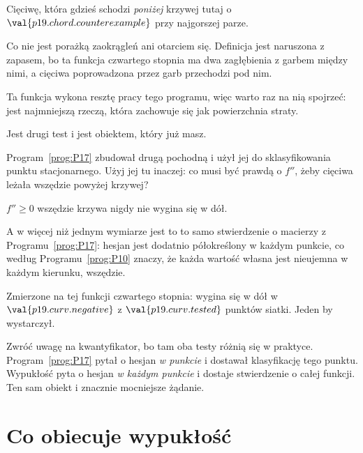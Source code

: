 \begin{fr}
\begin{ansblock}
Cięciwę, która gdzieś schodzi \emph{poniżej} krzywej \dash{} tutaj o
$\val{p19.chord.counterexample}$ przy najgorszej parze.
\end{ansblock}

Co nie jest porażką zaokrągleń ani otarciem się. Definicja jest naruszona z
zapasem, bo ta funkcja czwartego stopnia ma dwa zagłębienia z garbem między
nimi, a cięciwa poprowadzona przez garb przechodzi pod nim.

Ta funkcja wykona resztę pracy tego programu, więc warto raz na nią spojrzeć:
jest najmniejszą rzeczą, która zachowuje się jak powierzchnia straty.
\end{fr}

\begin{fr}
Jest drugi test i jest obiektem, który już masz.

Program~\ref{prog:P17} zbudował drugą pochodną i użył jej do sklasyfikowania
punktu stacjonarnego. Użyj jej tu inaczej: co musi być prawdą o $f''$, żeby
cięciwa leżała wszędzie powyżej krzywej?
\dotline
\nextframe
\end{fr}

\begin{fr}
\begin{ansblock}
$f'' \ge 0$ wszędzie \dash{} krzywa nigdy nie wygina się w dół.
\end{ansblock}

A w więcej niż jednym wymiarze jest to to samo stwierdzenie o macierzy z
Programu~\ref{prog:P17}: hesjan jest dodatnio półokreślony w każdym punkcie,
co według Programu~\ref{prog:P10} znaczy, że każda wartość własna jest
nieujemna w każdym kierunku, wszędzie.

Zmierzone na tej funkcji czwartego stopnia: wygina się w dół w
$\val{p19.curv.negative}$ z $\val{p19.curv.tested}$ punktów siatki. Jeden by
wystarczył.

\begin{note}
Zwróć uwagę na kwantyfikator, bo tam oba testy różnią się w praktyce.
Program~\ref{prog:P17} pytał o hesjan \emph{w punkcie} i dostawał
klasyfikację tego punktu. Wypukłość pyta o hesjan \emph{w każdym punkcie} i
dostaje stwierdzenie o całej funkcji. Ten sam obiekt i znacznie mocniejsze
żądanie.
\end{note}
\end{fr}

\section{Co obiecuje wypukłość}
\label{sec:P19-promise}

